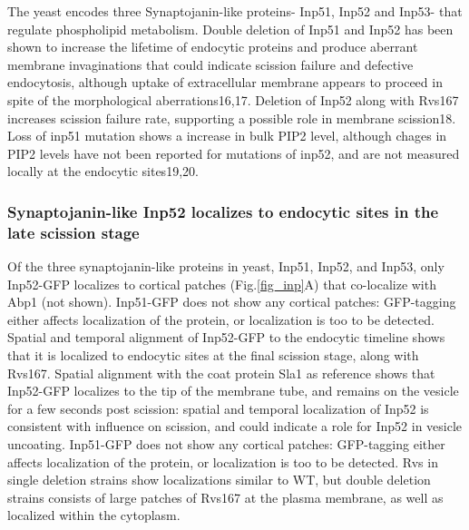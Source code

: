 	\vspace{5mm}
	The yeast encodes three Synaptojanin-like proteins- Inp51, Inp52 and Inp53- that regulate phospholipid metabolism. Double deletion of Inp51 and Inp52 has been shown to increase the lifetime of endocytic proteins and produce aberrant membrane invaginations that could indicate scission failure and defective endocytosis, although uptake of extracellular membrane appears to proceed in spite of the morphological aberrations16,17. Deletion of Inp52 along with Rvs167 increases scission failure rate, supporting a possible role in membrane scission18. Loss of inp51 mutation shows a increase in bulk PIP2 level, although chages in PIP2 levels have not been reported for mutations of inp52, and are not measured locally at the endocytic sites19,20.
		

		\subsubsection{Synaptojanin-like Inp52 localizes to endocytic sites in the late scission stage}
		Of the three synaptojanin-like proteins in yeast, Inp51, Inp52, and Inp53, only Inp52-GFP localizes to cortical patches (Fig.\ref{fig_inp}A) that co-localize with Abp1 (not shown). Inp51-GFP does not show any cortical patches: GFP-tagging either affects localization of the protein, or localization is too to be detected. Spatial and temporal alignment of Inp52-GFP to the endocytic timeline shows that it is localized to endocytic sites at the final scission stage, along with Rvs167. Spatial alignment with the coat protein Sla1 as reference shows that Inp52-GFP localizes to the tip of the membrane tube, and remains on the vesicle for a few seconds post scission: spatial and temporal localization of Inp52 is consistent with influence on scission, and could indicate a role for Inp52 in vesicle uncoating. Inp51-GFP does not show any cortical patches: GFP-tagging either affects localization of the protein, or localization is too to be detected. Rvs in single deletion strains show localizations similar to WT, but double deletion strains consists of large patches of Rvs167 at the plasma membrane, as well as localized within the cytoplasm. 
		
